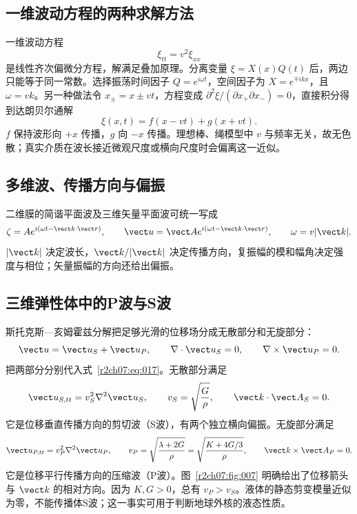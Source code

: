 \subsection{一维波动方程的两种求解方法}
\label{r2ch07:subsec:oned}

一维波动方程
\begin{equation}
 \xi_{tt}=v^2\xi_{xx}
 \label{r2ch07:eq:019}
\end{equation}
是线性齐次偏微分方程，解满足叠加原理。分离变量 $\xi=X(x)Q(t)$ 后，两边只能等于同一常数。选择振荡时间因子 $Q=e^{i\omega t}$，空间因子为 $X=e^{\mp ikx}$，且 $\omega=vk$。另一种做法令 $x_\pm=x\pm vt$，方程变成 $\partial^2\xi/(\partial x_+\partial x_-)=0$，直接积分得到达朗贝尔通解
\begin{equation}
 \boxed{\xi(x,t)=f(x-vt)+g(x+vt)}.
 \label{r2ch07:eq:020}
\end{equation}
$f$ 保持波形向 $+x$ 传播，$g$ 向 $-x$ 传播。理想棒、绳模型中 $v$ 与频率无关，故无色散；真实介质在波长接近微观尺度或横向尺度时会偏离这一近似。

\subsection{多维波、传播方向与偏振}
\label{r2ch07:subsec:multidim}

二维膜的简谐平面波及三维矢量平面波可统一写成
\begin{equation}
 \zeta=Ae^{i(\omega t-\vect k\cdot\vect r)},\qquad
 \vect u=\vect A e^{i(\omega t-\vect k\cdot\vect r)},\qquad
 \omega=v|\vect k|.
 \label{r2ch07:eq:021}
\end{equation}
$|\vect k|$ 决定波长，$\vect k/|\vect k|$ 决定传播方向，复振幅的模和幅角决定强度与相位；矢量振幅的方向还给出偏振。

\subsection{三维弹性体中的P波与S波}
\label{r2ch07:subsec:bodywaves}

斯托克斯—亥姆霍兹分解把足够光滑的位移场分成无散部分和无旋部分：
\begin{equation}
 \vect u=\vect u_S+\vect u_P,\qquad
 \nabla\cdot\vect u_S=0,\qquad
 \nabla\times\vect u_P=0.
 \label{r2ch07:eq:022}
\end{equation}
把两部分分别代入式~\eqref{r2ch07:eq:017}。无散部分满足
\begin{equation}
 \vect u_{S,tt}=v_S^2\nabla^2\vect u_S,\qquad
 v_S=\sqrt{\frac G\rho},\qquad
 \vect k\cdot\vect A_S=0.
 \label{r2ch07:eq:023}
\end{equation}
它是位移垂直传播方向的剪切波（S波），有两个独立横向偏振。无旋部分满足
\begin{equation}
 \vect u_{P,tt}=v_P^2\nabla^2\vect u_P,\qquad
 v_P=\sqrt{\frac{\lambda+2G}{\rho}}
 =\sqrt{\frac{K+4G/3}{\rho}},\qquad
 \vect k\times\vect A_P=0.
 \label{r2ch07:eq:024}
\end{equation}
它是位移平行传播方向的压缩波（P波）。图~\ref{r2ch07:fig:007} 明确给出了位移箭头与 $\vect k$ 的相对方向。因为 $K,G>0$，总有 $v_P>v_S$。液体的静态剪变模量近似为零，不能传播体S波；这一事实可用于判断地球外核的液态性质。
\figBodyWaves

